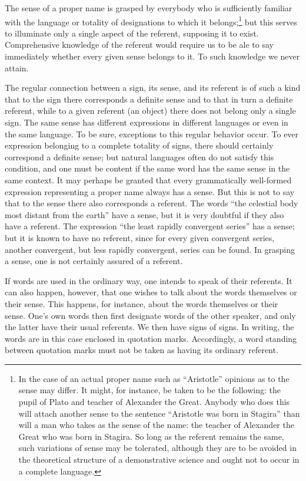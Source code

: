 \documentclass[twoside,12pt]{article}
\begin{document}
The sense of a proper name is grasped by everybody who is sufficiently
familiar with the language or totality of designations to which it
belongs;\footnote[2]{In the case of an actual proper name such as
  ``Aristotle'' opinions as to the sense may differ. It might, for
  instance, be taken to be the following: the pupil of Plato and
  teacher of Alexander the Great. Anybody who does this will attach
  another sense to the sentence ``Aristotle was born in Stagira'' than
  will a man who takes as the sense of the name: the teacher of
  Alexander the Great who was born in Stagira. So long as the referent
  remains the same, such variations of sense may be tolerated,
  although they are to be avoided in the theoretical structure of a
  demonstrative science and ought not to occur in a complete
  language.} but this serves to illuminate only a single aspect of the
referent, supposing it to exist. Comprehensive knowledge of the
referent would require us to be ale to say immediately whether every
given sense belongs to it. To such knowledge we never attain.

The regular connection between a sign, its sense, and its referent is
of such a kind that to the sign there corresponds a definite sense and
to that in turn a definite referent, while to a given referent (an
object) there does not belong only a single sign. The same sense has
different expressions in different languages or even in the same
language. To be sure, exceptions to this regular behavior occur. To
ever expression belonging to a complete totality of signs, there
should certainly correspond a definite sense; but natural languages
often do  not satisfy this condition, and one must be
content if the same word has the same sense in the same context. It
may perhaps be granted that every grammatically well-formed expression
representing a proper name always has a sense. But this is not to say
that to the sense there also corresponds a referent. The words ``the
celestial body most distant from the earth'' have a sense, but it is
very doubtful if they also have a referent. The expression ``the least
rapidly convergent series'' has a sense; but it is known to have no
referent, since for every given convergent series, another convergent,
but less rapidly convergent, series can be found. In grasping a sense,
one is not certainly assured of a referent.

If words are used in the ordinary way, one intends to speak of their
referents. It can also happen, however, that one wishes to talk about
the words themselves or their sense. This happens, for instance, about
the words themselves or their sense. One's own words then first
designate words of the other speaker, and only the latter have their
usual referents. We then have signs of signs. In writing, the words
are in this case enclosed in quotation marks. Accordingly, a word
standing between quotation marks must not be taken as having its
ordinary referent.
\end{document}
